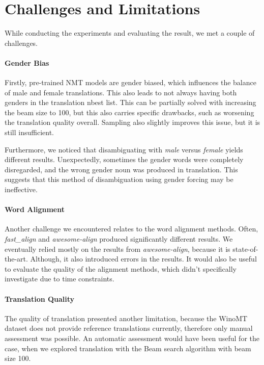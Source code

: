 \section{Challenges and Limitations}
\label{sec:Discussion:Challenges}

While conducting the experiments and evaluating the result, we met a couple of challenges.

\paragraph{Gender Bias}
Firstly, pre-trained NMT models are gender biased, which influences the balance of male and female translations. This also leads to not always having both genders in the translation nbest list. This can be partially solved with increasing the beam size to 100, but this also carries specific drawbacks, such as worsening the translation quality overall. Sampling also slightly improves this issue, but it is still insufficient.

Furthermore, we noticed that disambiguating with \textit{male} versus \textit{female} yields different results. Unexpectedly, sometimes the gender words were completely disregarded, and the wrong gender noun was produced in translation. This suggests that this method of disambiguation using gender forcing may be ineffective.

\paragraph{Word Alignment}
Another challenge we encountered relates to the word alignment methods. Often, \textit{fast\_align} and \textit{awesome-align} produced significantly different results. We eventually relied mostly on the results from \textit{awesome-align}, because it is state-of-the-art. Although, it also introduced errors in the results. It would also be useful to evaluate the quality of the alignment methods, which didn't specifically investigate due to time constraints.

\paragraph{Translation Quality}
The quality of translation presented another limitation, because the WinoMT dataset does not provide reference translations currently, therefore only manual assessment was possible. An automatic assessment would have been useful for the case, when we explored translation with the Beam search algorithm with beam size 100.



